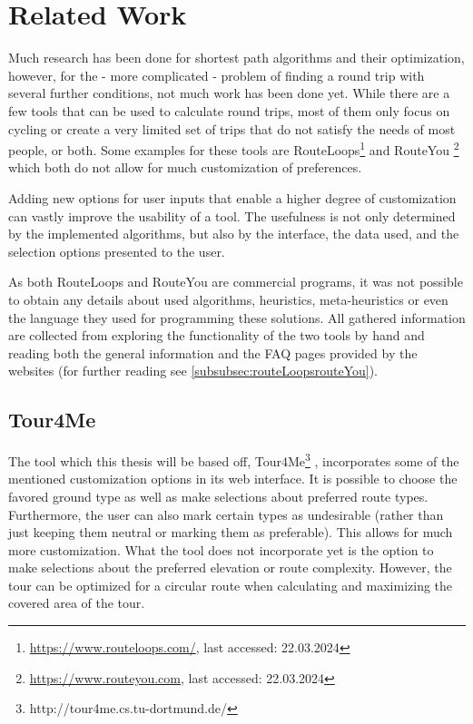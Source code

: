 \section{Related Work}
\label{sec:relatedWork}


Much research has been done for shortest path algorithms and their optimization, however, for the - more complicated \cite{gemsa_efficient_2013} - problem of finding a round trip with several further conditions, not much work has been done yet.
While there are a few tools that can be used to calculate round trips, most of them only focus on cycling or create a very limited set of trips that do not satisfy the needs of most people, or both. 
Some examples for these tools are RouteLoops\footnote{\url{https://www.routeloops.com/}, last accessed: 22.03.2024} and RouteYou \footnote{\url{https://www.routeyou.com}, last accessed: 22.03.2024} which both do not allow for much customization of preferences. 

Adding new options for user inputs that enable a higher degree of customization can vastly improve the usability of a tool. 
The usefulness is not only determined by the implemented algorithms, but also by the interface, the data used, and the selection options presented to the user. 

As both RouteLoops and RouteYou are commercial programs, it was not possible to obtain any details about used algorithms, heuristics, meta-heuristics or even the language they used for programming these solutions.
All gathered information are collected from exploring the functionality of the two tools by hand and reading both the general information and the FAQ pages provided by the websites (for further reading see \ref{subsubsec:routeLoopsrouteYou}). 

\subsection{Tour4Me}
\label{subsec:Tour4Me}

The tool which this thesis will be based off, Tour4Me\footnote{http://tour4me.cs.tu-dortmund.de/} \cite{buchin_tour4me_2022}, incorporates some of the mentioned customization options in its web interface. 
It is possible to choose the favored ground type as well as make selections about preferred route types.
Furthermore, the user can also mark certain types as undesirable (rather than just keeping them neutral or marking them as preferable).
This allows for much more customization.
What the tool does not incorporate yet is the option to make selections about the preferred elevation or route complexity.
However, the tour can be optimized for a circular route when calculating and maximizing the covered area of the tour. 

